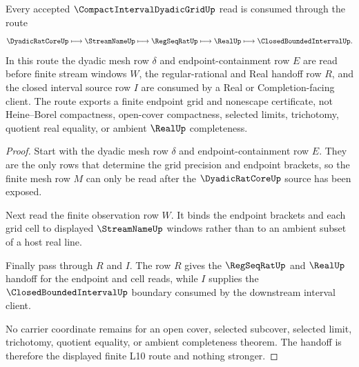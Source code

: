 \begin{theorem}
\label{thm:compact-interval-dyadic-grid-real-handoff}
Every accepted $\CompactIntervalDyadicGridUp$ read is consumed through the route
$$
\DyadicRatCoreUp \longmapsto \StreamNameUp \longmapsto \RegSeqRatUp \longmapsto \RealUp \longmapsto \ClosedBoundedIntervalUp .
$$
In this route the dyadic mesh row $\delta$ and endpoint-containment row $E$ are read before finite stream windows $W$, the regular-rational and Real handoff row $R$, and the closed interval source row $I$ are consumed by a Real or Completion-facing client. The route exports a finite endpoint grid and nonescape certificate, not Heine--Borel compactness, open-cover compactness, selected limits, trichotomy, quotient real equality, or ambient $\RealUp$ completeness.
\end{theorem}
\begin{proof}
Start with the dyadic mesh row $\delta$ and endpoint-containment row $E$. They are the only rows that determine the grid precision and endpoint brackets, so the finite mesh row $M$ can only be read after the $\DyadicRatCoreUp$ source has been exposed.

Next read the finite observation row $W$. It binds the endpoint brackets and each grid cell to displayed $\StreamNameUp$ windows rather than to an ambient subset of a host real line.

Finally pass through $R$ and $I$. The row $R$ gives the $\RegSeqRatUp$ and $\RealUp$ handoff for the endpoint and cell reads, while $I$ supplies the $\ClosedBoundedIntervalUp$ boundary consumed by the downstream interval client.

No carrier coordinate remains for an open cover, selected subcover, selected limit, trichotomy, quotient equality, or ambient completeness theorem. The handoff is therefore the displayed finite L10 route and nothing stronger.
\end{proof}



